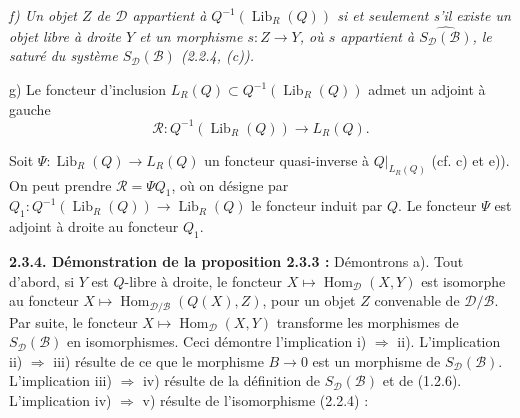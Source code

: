 \clearpage
{}%
\begingroup
\small
\setlength{\parskip}{0pt}%
\setlength{\emergencystretch}{1.5em}%
\setlength{\abovedisplayskip}{3pt plus 1pt minus 1pt}%
\setlength{\belowdisplayskip}{3pt plus 1pt minus 1pt}%
\sloppy

\begingroup\itshape
{}
\noindent f) Un objet $Z$ de $\mathcal D$ appartient à
$Q^{-1}(\operatorname{Lib}_R(Q))$ si et seulement s'il existe un objet
libre à droite $Y$ et un morphisme $s\colon Z\longrightarrow Y$, où $s$
appartient à $\widehat{S_{\mathcal D}(\mathcal B)}$, le saturé du système
$S_{\mathcal D}(\mathcal B)$ (2.2.4, (c)).

\par\noindent g) Le foncteur d'inclusion
$L_R(Q)\subset Q^{-1}(\operatorname{Lib}_R(Q))$ admet un adjoint à gauche
\[
  \mathcal R\colon Q^{-1}(\operatorname{Lib}_R(Q))\longrightarrow L_R(Q).
\]

\begin{center}
\end{center}
\endgroup

Soit $\Psi\colon\operatorname{Lib}_R(Q)\longrightarrow L_R(Q)$ un foncteur
quasi-inverse à $Q|_{L_R(Q)}$ (cf. c) et e)). On peut prendre
$\mathcal R=\Psi Q_1$, où on désigne par
$Q_1\colon Q^{-1}(\operatorname{Lib}_R(Q))\longrightarrow
\operatorname{Lib}_R(Q)$ le foncteur induit par $Q$. Le foncteur $\Psi$ est
adjoint à droite au foncteur $Q_1$.

\medskip
\noindent\textbf{2.3.4. Démonstration de la proposition 2.3.3 :}\quad
{}
Démontrons a). Tout d'abord, si $Y$ est $Q$-libre à droite, le foncteur
$X\longmapsto\operatorname{Hom}_{\mathcal D}(X,Y)$ est isomorphe au
foncteur
$X\longmapsto\operatorname{Hom}_{\mathcal D/\mathcal B}(Q(X),Z)$, pour un
objet $Z$ convenable de $\mathcal D/\mathcal B$. Par suite, le foncteur
$X\longmapsto\operatorname{Hom}_{\mathcal D}(X,Y)$ transforme les
morphismes de $S_{\mathcal D}(\mathcal B)$ en isomorphismes. Ceci démontre
l'implication i) $\Rightarrow$ ii). L'implication ii) $\Rightarrow$ iii)
résulte de ce que le morphisme $B\longrightarrow0$ est un morphisme de
$S_{\mathcal D}(\mathcal B)$. L'implication iii) $\Rightarrow$ iv) résulte
de la définition de $S_{\mathcal D}(\mathcal B)$ et de (1.2.6).
L'implication iv) $\Rightarrow$ v) résulte de l'isomorphisme (2.2.4) :

